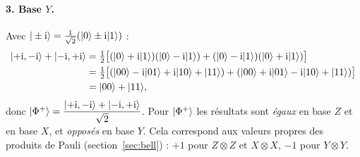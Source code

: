 \begin{correction}
\paragraph{3. Base $Y$.} Avec $|\pm\mathrm{i}\rangle=\frac{1}{\sqrt2}(|0\rangle\pm\mathrm{i}|1\rangle)$ :
\begin{align*}
  |{+}\mathrm{i},{-}\mathrm{i}\rangle+|{-}\mathrm{i},{+}\mathrm{i}\rangle
  &=\tfrac12\big[(|0\rangle+\mathrm{i}|1\rangle)(|0\rangle-\mathrm{i}|1\rangle)+(|0\rangle-\mathrm{i}|1\rangle)(|0\rangle+\mathrm{i}|1\rangle)\big]\\
  &=\tfrac12\big[(|00\rangle-\mathrm{i}|01\rangle+\mathrm{i}|10\rangle+|11\rangle)+(|00\rangle+\mathrm{i}|01\rangle-\mathrm{i}|10\rangle+|11\rangle)\big]\\
  &=|00\rangle+|11\rangle,
\end{align*}
donc $|\Phi^+\rangle=\dfrac{|{+}\mathrm{i},{-}\mathrm{i}\rangle+|{-}\mathrm{i},{+}\mathrm{i}\rangle}{\sqrt2}$. Pour $|\Phi^+\rangle$ les
résultats sont \emph{égaux} en base $Z$ et en base $X$, et \emph{opposés} en base $Y$. Cela
correspond aux valeurs propres des produits de Pauli (section~\ref{sec:bell}) : $+1$ pour $Z\otimes Z$ et
$X\otimes X$, $-1$ pour $Y\otimes Y$.
\end{correction}

